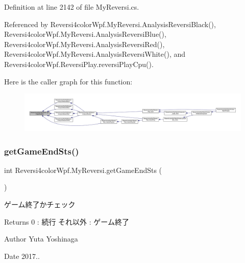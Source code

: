 Definition at line 2142 of file My\+Reversi.\+cs.



Referenced by Reversi4color\+Wpf.\+My\+Reversi.\+Analysis\+Reversi\+Black(), Reversi4color\+Wpf.\+My\+Reversi.\+Analysis\+Reversi\+Blue(), Reversi4color\+Wpf.\+My\+Reversi.\+Analysis\+Reversi\+Red(), Reversi4color\+Wpf.\+My\+Reversi.\+Analysis\+Reversi\+White(), and Reversi4color\+Wpf.\+Reversi\+Play.\+reversi\+Play\+Cpu().

Here is the caller graph for this function\+:
\nopagebreak
\begin{figure}[H]
\begin{center}
\leavevmode
\includegraphics[width=350pt]{class_reversi4color_wpf_1_1_my_reversi_a3eeb1a89964b807fcd672907697f59c2_icgraph}
\end{center}
\end{figure}
\mbox{\label{class_reversi4color_wpf_1_1_my_reversi_a0aa1a90ea5faa1685b89617a50a6a2e1}} 
\subsubsection{\texorpdfstring{get\+Game\+End\+Sts()}{getGameEndSts()}}
{\footnotesize\ttfamily int Reversi4color\+Wpf.\+My\+Reversi.\+get\+Game\+End\+Sts (\begin{DoxyParamCaption}{ }\end{DoxyParamCaption})}



ゲーム終了かチェック 

\begin{DoxyReturn}{Returns}
0 \+: 続行 それ以外 \+: ゲーム終了 
\end{DoxyReturn}
\begin{DoxyAuthor}{Author}
Yuta Yoshinaga 
\end{DoxyAuthor}
\begin{DoxyDate}{Date}
2017.. 
\end{DoxyDate}


